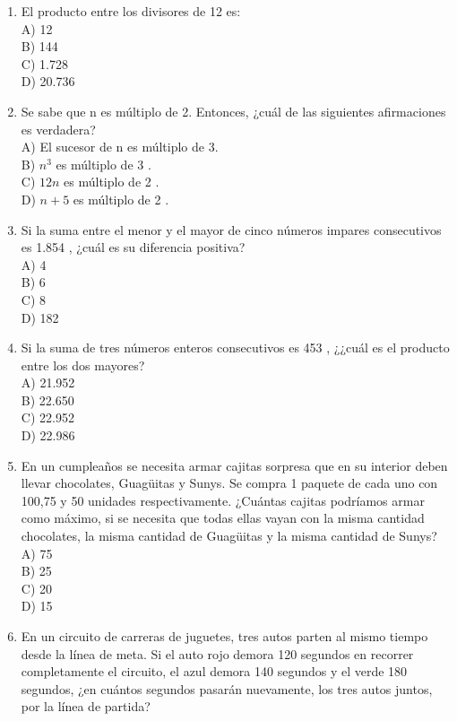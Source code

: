 \documentclass[10pt]{article}
\begin{document}
\begin{enumerate}
A) -21\\
B) -20\\
C) -19\\
D) -17
  \item El producto entre los divisores de 12 es:\\
A) 12\\
B) 144\\
C) 1.728\\
D) 20.736
  \item Se sabe que n es múltiplo de 2. Entonces, ¿cuál de las siguientes afirmaciones es verdadera?\\
A) El sucesor de n es múltiplo de 3.\\
B) $n^{3}$ es múltiplo de 3 .\\
C) $12 n$ es múltiplo de 2 .\\
D) $n+5$ es múltiplo de 2 .
  \item Si la suma entre el menor y el mayor de cinco números impares consecutivos es 1.854 , ¿cuál es su diferencia positiva?\\
A) 4\\
B) 6\\
C) 8\\
D) 182
  \item Si la suma de tres números enteros consecutivos es 453 , ¿¿cuál es el producto entre los dos mayores?\\
A) 21.952\\
B) 22.650\\
C) 22.952\\
D) 22.986
  \item En un cumpleaños se necesita armar cajitas sorpresa que en su interior deben llevar chocolates, Guagüitas y Sunys. Se compra 1 paquete de cada uno con 100,75 y 50 unidades respectivamente. ¿Cuántas cajitas podríamos armar como máximo, si se necesita que todas ellas vayan con la misma cantidad chocolates, la misma cantidad de Guagüitas y la misma cantidad de Sunys?\\
A) 75\\
B) 25\\
C) 20\\
D) 15
  \item En un circuito de carreras de juguetes, tres autos parten al mismo tiempo desde la línea de meta. Si el auto rojo demora 120 segundos en recorrer completamente el circuito, el azul demora 140 segundos y el verde 180 segundos, ¿en cuántos segundos pasarán nuevamente, los tres autos juntos, por la línea de partida?\\

\end{enumerate}
\end{document}
